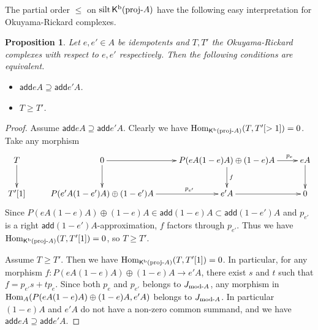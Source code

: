 \documentclass[a4paper,reqno]{amsart}
\newtheorem{corollary}[theorem]{Corollary}
\newtheorem{proposition}[theorem]{Proposition}
\theoremstyle{definition}
\newtheorem{remark}[theorem]{Remark}
\newcommand{\add}{\mathsf{add}}
\newcommand{\Hom}{\operatorname{Hom}\nolimits}
\newcommand{\silt}{\operatorname{silt}\nolimits}
\newcommand{\modu}[1]{{\rm{mod}}\text{-}#1} %
\newcommand{\proj}[1]{{\rm{proj}}\text{-}#1} %
\newcommand{\homo}[3]{{\rm{Hom}}_{#1}(#2, #3)} %
\newcommand{\K}{\mathsf{K}}
\begin{document}


The partial order $\le$ on $\silt{\K^{\rm{b}}(\proj{A})}$
have the following easy interpretation for Okuyama-Rickard complexes. 

\begin{proposition}\label{prop:relation of OR}
Let $e, e'\in A$ be idempotents and $T, T'$ the Okuyama-Rickard complexes with respect to $e, e'$ respectively. 
Then the following conditions are equivalent.
\begin{itemize}
\item[(a)] $\add{eA} \supseteq \add{e'A}$.
\item[(b)] $T \ge T'$.   
\end{itemize}
\end{proposition}

\begin{proof}
Assume $\add{eA} \supseteq \add{e'A}$. 
Clearly we have $\Hom_{\K^{\rm{b}}(\proj{A})}(T,T'[>1])=0$. 
Take any morphism
\[\xymatrix{
T\ar[d]&0\ar[r]\ar[d]&P(eA(1-e)A)\oplus(1-e)A\ar^(0.8){p_{e}}[r]\ar^{f}[d]&eA\ar[d]\\
T'[1]&P(e'A(1-e')A)\oplus(1-e')A\ar^(0.7){p_{e'}}[r]&e'A\ar[r]&0
}\]
Since $P(eA(1-e)A)\oplus(1-e)A\in\add{(1-e)A}\subset\add{(1-e')A}$
and $p_{e'}$ is a right $\add{(1-e')A}$-approximation, $f$ factors through $p_{e'}$.
Thus we have $\Hom_{\K^{\rm{b}}(\proj{A})}(T,T'[1])=0$, so $T\ge T'$. 

Assume $T\ge T'$. Then we have $\Hom_{\K^{\rm{b}}(\proj{A})}(T,T'[1])=0$.
In particular, for any morphism $f:P(eA(1-e)A)\oplus(1-e)A\to e'A$,
there exist $s$ and $t$ such that $f=p_{e'}s+tp_e$.
Since both $p_e$ and $p_{e'}$ belongs to $J_{\modu{A}}$, any morphism
in $\homo{A}{P(eA(1-e)A)\oplus(1-e)A}{e'A}$ belongs to $J_{\modu{A}}$.
In particular $(1-e)A$ and $e'A$ do not have a non-zero common summand,
and we have  $\add{eA}\supseteq \add{e'A}$. 
\end{proof}
\end{document}
